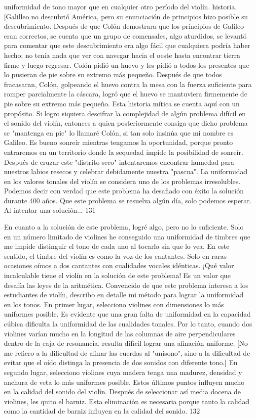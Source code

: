 uniformidad de tono mayor que en cualquier otro período del violín.
historia.
[Galilleo no descubrió América, pero su enunciación de principios hizo posible su descubrimiento. Después de que Colón demostrara que los principios de Galileo eran correctos, se cuenta que un grupo de comensales, algo aturdidos, se levantó para comentar que este descubrimiento era algo fácil que cualquiera podría haber hecho; no tenía nada que ver con navegar hacia el oeste hasta encontrar tierra firme y luego regresar. Colón pidió un huevo y les pidió a todos los presentes que lo pusieran de pie sobre su extremo más pequeño. Después de que todos fracasaran, Colón, golpeando el huevo contra la mesa con la fuerza suficiente para romper parcialmente la cáscara, logró que el huevo se mantuviera firmemente de pie sobre su extremo más pequeño. Esta historia mítica se cuenta aquí con un propósito.
Si logro siquiera descifrar la complejidad de algún problema difícil en el sonido del violín, entonces a quien posteriormente consiga que dicho problema se "mantenga en pie" lo llamaré Colón, si tan solo insinúa que mi nombre es Galileo.
Es bueno sonreír mientras tengamos la oportunidad, porque pronto entraremos en un territorio donde la sequedad impide la posibilidad de sonreír. Después de cruzar este "distrito seco" intentaremos encontrar humedad para nuestros labios resecos y celebrar debidamente nuestra "pascua". La uniformidad en los valores tonales del violín se considera uno de los problemas irresolubles. Podemos decir con verdad que este problema ha desafiado con éxito la solución durante 400 años. Que este problema se resuelva algún día, solo podemos esperar. Al intentar una solución...
131

En cuanto a la solución de este problema, logré algo, pero no lo suficiente. Solo en un número limitado de violines he conseguido una uniformidad de timbres que me impide distinguir el tono de cada uno al tocarlo sin que lo vea. En este sentido, el timbre del violín es como la voz de los cantantes. Solo en raras ocasiones oímos a dos cantantes con cualidades vocales idénticas.
¡Qué valor incalculable tiene el violín en la solución de este problema!
Es un valor que desafía las leyes de la aritmética.
Convencido de que este problema interesa a los estudiantes de violín, describo en detalle mi método para lograr la uniformidad en los tonos. En primer lugar, selecciono violines con dimensiones lo más uniformes posible. Es evidente que una gran falta de uniformidad en la capacidad cúbica dificulta la uniformidad de las cualidades tonales. Por lo tanto, cuando dos violines varían mucho en la longitud de las columnas de aire perpendiculares dentro de la caja de resonancia, resulta difícil lograr una afinación uniforme.
[No me refiero a la dificultad de afinar las cuerdas al "unísono", sino a la dificultad de evitar que el oído distinga la presencia de dos sonidos con diferente tono.]
En segundo lugar, selecciono violines cuya madera tenga una madurez, densidad y anchura de veta lo más uniformes posible. Estos últimos puntos influyen mucho en la calidad del sonido del violín. Después de seleccionar así media docena de violines, les quito el barniz. Esta eliminación es necesaria porque tanto la calidad como la cantidad de barniz influyen en la calidad del sonido.
132


